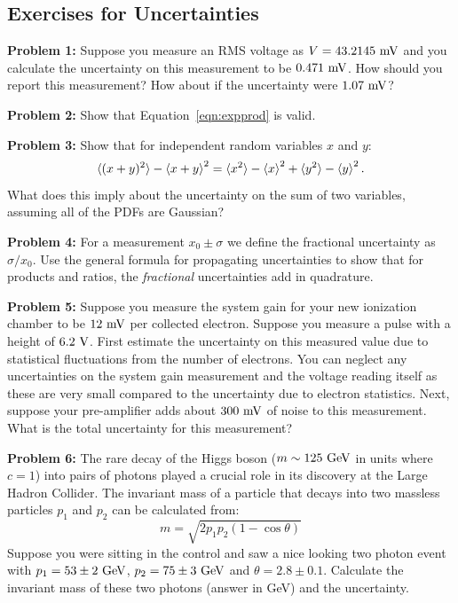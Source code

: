 \documentclass[12pt]{article}
\begin{document}
\subsection{Exercises for Uncertainties}

\noindent
{\bf Problem 1:}  Suppose you measure an RMS voltage as $V = 43.2145~\rm mV$ and you calculate the uncertainty on this measurement to be $0.471~\rm mV$.  How should you report this measurement?  How about if the uncertainty were $1.07~\rm mV$? \\ \vskip 0.25cm

\noindent
{\bf Problem 2:}  Show that Equation~\ref{eqn:expprod} is valid. \\ \vskip 0.25cm

\noindent
{\bf Problem 3:}  Show that for independent random variables $x$ and $y$:
\begin{displaymath}
\braket{(x+y)^2} - \braket{x+y}^2 = \braket{x^2} - \braket{x}^2 + \braket{y^2} - \braket{y}^2.
\end{displaymath}
What does this imply about the uncertainty on the sum of two variables, assuming all of the PDFs are Gaussian? \\ \vskip 0.25cm

\noindent
{\bf Problem 4:}  For a measurement $x_0 \pm \sigma$ we define the fractional uncertainty as $\sigma/x_0$.  Use the general formula for propagating uncertainties to show that for products and ratios, the {\em fractional} uncertainties add in quadrature.  \\ \vskip 0.25cm

\noindent
{\bf Problem 5:}  Suppose you measure the system gain for your new ionization chamber to be $12~\rm mV$ per collected electron.  Suppose you measure a pulse with a height of $6.2~\rm V$.  First estimate the uncertainty on this measured value due to statistical fluctuations from the number of electrons.   You can neglect any uncertainties on the system gain measurement and the voltage reading itself as these are very small compared to the uncertainty due to electron statistics.  Next, suppose your pre-amplifier adds about $300~\rm mV$ of noise to this measurement.  What is the total uncertainty for this measurement? \\ \vskip 0.25cm

\noindent
{\bf Problem 6:}  The rare decay of the Higgs boson ($m \sim125~\rm GeV$ in units where $c=1$) into pairs of photons played a crucial role in its discovery at the Large Hadron Collider.  The invariant mass of a particle that decays into two massless particles $p_1$ and $p_2$ can be calculated from:
\begin{displaymath}
m = \sqrt{2  p_1 p_2 (1 - \cos\theta)}
\end{displaymath}
Suppose you were sitting in the control and saw a nice looking two photon event with 
$p_1=53 \pm 2~\rm GeV$, $p_2=75 \pm 3~\rm GeV$ and $\theta = 2.8 \pm 0.1$.   Calculate the invariant mass of these two photons (answer in GeV) and the uncertainty. \\ \vskip 0.25cm
\end{document}
